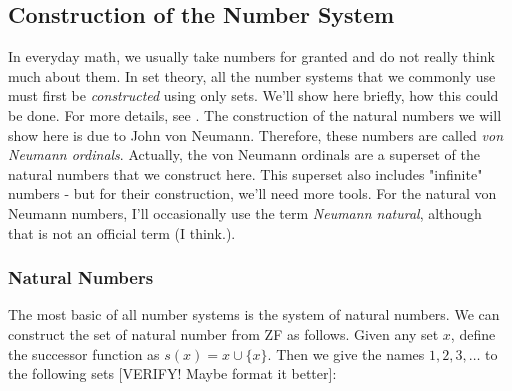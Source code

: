 \subsection{Construction of the Number System}
In everyday math, we usually take numbers for granted and do not really think much about them. In set theory, all the number systems that we commonly use must first be \emph{constructed} using only sets. We'll show here briefly, how this could be done. For more details, see \cite{PDF_MathFAQ}. The construction of the natural numbers we will show here is due to John von Neumann. Therefore, these numbers are called \emph{von Neumann ordinals}. Actually, the von Neumann ordinals are a superset of the natural numbers that we construct here. This superset also includes "infinite" numbers - but for their construction, we'll need more tools. For the natural von Neumann numbers, I'll occasionally use the term \emph{Neumann natural}, although that is not an official term (I think.).





\subsubsection{Natural Numbers}
The most basic of all number systems is the system of natural numbers. We can construct the set of natural number from ZF as follows. Given any set $x$, define the successor function as $s(x) = x \cup \{ x \}$. Then we give the names $1,2,3,\ldots$ to the following sets [VERIFY! Maybe format it better]: 

